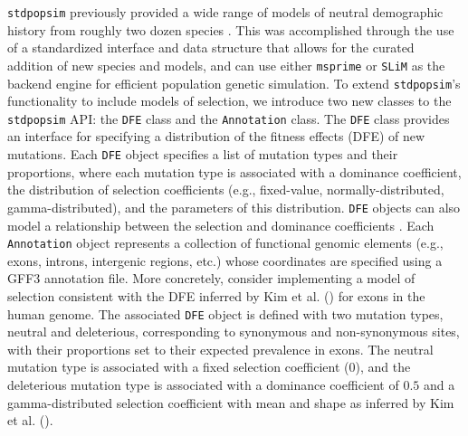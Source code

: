 \documentclass[hidelinks]{article}
\newcommand{\stdpopsim}{\texttt{stdpopsim}\xspace}
\newcommand{\slim}{\texttt{SLiM}\xspace}
\newcommand{\msprime}{\texttt{msprime}\xspace}
\begin{document}
    \stdpopsim previously provided a wide range of models of neutral
    demographic history from roughly two dozen species \citep{lauterbur2023expanding}.
    This was accomplished through the use of a standardized interface
    and data structure that allows for the curated addition of new
    species and models, and can use either
    \msprime \citep{Baumdicker2022} or \slim \citep{haller2019slim}
    as the backend engine for efficient population genetic simulation.
    To extend \stdpopsim's functionality to include models of selection,
    we introduce two new classes
    to the \stdpopsim API: the \texttt{DFE} class and the \texttt{Annotation} class.
    The \texttt{DFE} class provides an interface for specifying
    a distribution of the fitness effects (DFE) of new mutations.
    Each \texttt{DFE} object specifies a list of mutation types and
    their proportions, where
    each mutation type is associated with a dominance coefficient,
    the distribution of selection coefficients (e.g., fixed-value, normally-distributed, gamma-distributed),
    and the parameters of this distribution.
    \texttt{DFE} objects can also model a relationship between the selection and dominance coefficients \citep[][see \textbf{Methods}]{huber2018gene}.
    Each \texttt{Annotation} object represents a collection of functional
    genomic elements (e.g., exons, introns, intergenic regions, etc.)
    whose coordinates are specified using a GFF3 annotation file. 
    More concretely, consider implementing a model of selection consistent with the
    DFE inferred by Kim et al. (\citeyear{kim2017inference}) for exons in the human genome.
    The associated \texttt{DFE} object is defined with two mutation types,
    neutral and deleterious, corresponding to synonymous and non-synonymous sites,
    with their proportions set to their expected prevalence in exons.
    The neutral mutation type is associated with a fixed selection coefficient (0),
    and the deleterious mutation type is associated with a dominance coefficient of $0.5$ and
    a gamma-distributed selection coefficient
    with mean and shape as inferred by Kim et al. (\citeyear{kim2017inference}).
\end{document}
